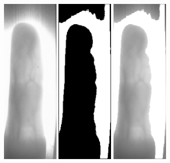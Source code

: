 \documentclass[11pt,a4paper]{article}
\begin{document}
\vfill
\begin{figure}[ht!]
	\centering
	\includegraphics[width=2.8cm]{fig/F_08_puvodni.eps}
	\includegraphics[width=2.8cm]{fig/F_08_maska.eps}
	\includegraphics[width=2.8cm]{fig/F_08_aplikovana_maska.eps}

\end{figure}
\end{document}
